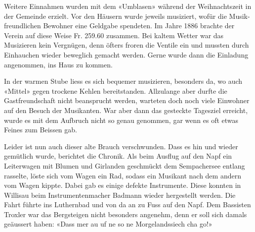 \begin{multicols}{2}
    Weitere Einnahmen wurden mit dem «Umblasen»  während der Weihnachtszeit
    in der Gemeinde erzielt. Vor den Häusern wurde jeweils musiziert, wofür die
    Musik-freundlichen Bewohner eine Geldgabe spendeten.
    Im Jahre 1886 brachte der Verein auf diese Weise Fr. 259.60 zusammen.
    Bei kaltem Wetter war das Musizieren kein Vergnügen, denn öfters froren
    die Ventile ein und mussten durch Einhauchen wieder beweglich gemacht werden.
    Gerne wurde dann die Einladung angenommen, ins Haus zu kommen.

    In der warmen Stube liess es sich bequemer musizieren, besonders da,
    wo auch «Mittel» gegen trockene Kehlen bereitstanden.
    Allzulange aber durfte die Gastfreundschaft nicht beansprucht werden,
    warteten doch noch viele Einwohner auf den Besuch der Musikanten.
    War aber dann das gesteckte Tagesziel erreicht, wurde
    es mit dem Aufbruch nicht so genau genommen, gar
    wenn es oft etwas Feines zum Beissen gab.

    Leider ist nun auch dieser alte Brauch verschwunden.
    Dass es hin und wieder gemütlich wurde, berichtet
    die Chronik. Als beim Ausflug auf den Napf ein
    Leiterwagen mit Blumen und Girlanden geschmückt
    dem Sempachersee entlang rasselte, löste sich vom
    Wagen ein Rad, sodass ein Musikant nach dem andern
    vom Wagen kippte. Dabei gab es einige defekte
    Instrumente. Diese konnten in Willisau beim Instrumentenmacher Badmann wieder hergestellt werden.
    Die Fahrt führte ins Luthernbad und von da an zu
    Fuss auf den Napf. Dem Bassisten Troxler war das
    Bergsteigen nicht besonders angenehm, denn er soll sich
    damals geäussert haben: «Dass mer au uf ne so ne Morgelandssiech cha go!»



\end{multicols}
